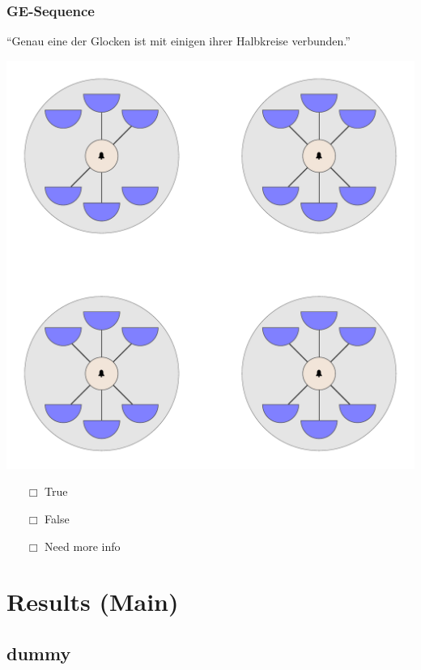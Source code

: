 \documentclass[fleqn,10pt,xcolor=dvipsnames]{beamer}
\newcommand{\GE}{GE\xspace}
\newcommand{\mymark}[1]{{\color{mycol}{#1}}}
\begin{document}
\begin{frame}
  \frametitle{\GE-Sequence}
  \begin{center}
    ``Genau eine der Glocken ist mit einigen ihrer Halbkreise verbunden.''

    \vspace{0.1cm}

    \includegraphics[width=0.5 \textwidth]{../../pictures/ge_01_5.pdf}

    \vspace{0.1cm}

    \begin{multicols}{3}
      \begin{itemize} 
      \item[$\Box$] True\\
        \onslide<2>{$\leadsto$  \mymark{local}}
      \item[$\Box$] False\\
        \onslide<2>{$\leadsto$ \mymark{false}}
      \item[$\Box$] Need more info 
      \end{itemize}
    \end{multicols}

  \end{center}
\end{frame}

\section{Results (Main)}
\subsection{dummy}
\end{document}
